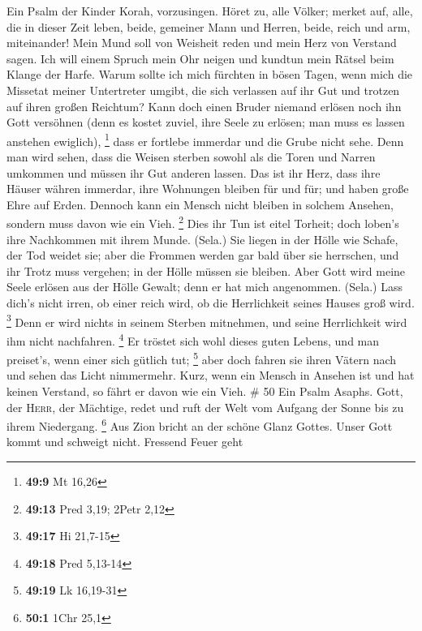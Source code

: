  Ein Psalm der Kinder Korah, vorzusingen. 
Höret zu, alle Völker; merket auf, alle, die in dieser Zeit leben,
 beide, gemeiner Mann und Herren, beide, reich und arm,
miteinander!  Mein Mund soll von Weisheit reden und mein
Herz von Verstand sagen.  Ich will einem Spruch mein Ohr
neigen und kundtun mein Rätsel beim Klange der Harfe. 
Warum sollte ich mich fürchten in bösen Tagen, wenn mich die Missetat
meiner Untertreter umgibt,  die sich verlassen auf ihr Gut
und trotzen auf ihren großen Reichtum?  Kann doch einen
Bruder niemand erlösen noch ihn Gott versöhnen  (denn es
kostet zuviel, ihre Seele zu erlösen; man muss es lassen anstehen
ewiglich), \footnote{\textbf{49:9} Mt 16,26}  dass er
fortlebe immerdar und die Grube nicht sehe.  Denn man
wird sehen, dass die Weisen sterben sowohl als die Toren und Narren
umkommen und müssen ihr Gut anderen lassen.  Das ist ihr
Herz, dass ihre Häuser währen immerdar, ihre Wohnungen bleiben für und
für; und haben große Ehre auf Erden.  Dennoch kann ein
Mensch nicht bleiben in solchem Ansehen, sondern muss davon wie ein
Vieh. \footnote{\textbf{49:13} Pred 3,19; 2Petr 2,12} 
Dies ihr Tun ist eitel Torheit; doch loben's ihre Nachkommen mit ihrem
Munde. (Sela.)  Sie liegen in der Hölle wie Schafe, der
Tod weidet sie; aber die Frommen werden gar bald über sie herrschen, und
ihr Trotz muss vergehen; in der Hölle müssen sie bleiben.
 Aber Gott wird meine Seele erlösen aus der Hölle Gewalt;
denn er hat mich angenommen. (Sela.)  Lass dich's nicht
irren, ob einer reich wird, ob die Herrlichkeit seines Hauses groß wird.
\footnote{\textbf{49:17} Hi 21,7-15}  Denn er wird nichts
in seinem Sterben mitnehmen, und seine Herrlichkeit wird ihm nicht
nachfahren. \footnote{\textbf{49:18} Pred 5,13-14}  Er
tröstet sich wohl dieses guten Lebens, und man preiset's, wenn einer
sich gütlich tut; \footnote{\textbf{49:19} Lk 16,19-31} 
aber doch fahren sie ihren Vätern nach und sehen das Licht nimmermehr.
 Kurz, wenn ein Mensch in Ansehen ist und hat keinen
Verstand, so fährt er davon wie ein Vieh. \# 50  Ein Psalm
Asaphs. Gott, der \textsc{Herr}, der Mächtige, redet und ruft der Welt
vom Aufgang der Sonne bis zu ihrem Niedergang. \footnote{\textbf{50:1}
  1Chr 25,1}  Aus Zion bricht an der schöne Glanz Gottes.
 Unser Gott kommt und schweigt nicht. Fressend Feuer geht
